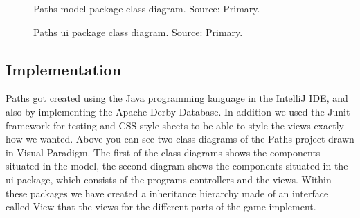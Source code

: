 \documentclass[British]{article}
\begin{document}
\newpage
\begin{figure}
\centering
{}
    \caption
    {Paths model package class diagram. Source: Primary.}
\end{figure}

\begin{figure}
\centering
{}
    \caption
    {Paths ui package class diagram. Source: Primary.}
\end{figure}

\newpage \pagebreak \cleardoublepage

\subsection{Implementation}
Paths got created using the Java programming language in the IntelliJ IDE, and also by implementing the Apache Derby Database. In addition we used the Junit framework for testing and CSS style sheets to be able to style the views exactly how we wanted. Above you can see two class diagrams of the Paths project drawn in Visual Paradigm. The first of the class diagrams shows the components situated in the model, the second diagram shows the components situated in the ui package, which consists of the programs controllers and the views. Within these packages we have created a inheritance hierarchy made of an interface called View that the views for the different parts of the game implement. 
\end{document}
